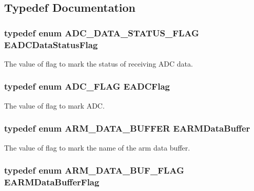 \subsection{Typedef Documentation}
\hypertarget{group___enum_grp_ga28f90ca377a944d61b5d7c95655e2d97}{
\subsubsection[{E\-A\-D\-C\-Data\-Status\-Flag}]{\setlength{\rightskip}{0pt plus 5cm}typedef enum A\-D\-C\-\_\-\-D\-A\-T\-A\-\_\-\-S\-T\-A\-T\-U\-S\-\_\-\-F\-L\-A\-G  {\bf E\-A\-D\-C\-Data\-Status\-Flag}}}\label{group___enum_grp_ga28f90ca377a944d61b5d7c95655e2d97}
The value of flag to mark the status of receiving A\-D\-C data. \hypertarget{group___enum_grp_ga7a77f876c6fae36cb97dfc3ba1e07665}{
\subsubsection[{E\-A\-D\-C\-Flag}]{\setlength{\rightskip}{0pt plus 5cm}typedef enum A\-D\-C\-\_\-\-F\-L\-A\-G  {\bf E\-A\-D\-C\-Flag}}}\label{group___enum_grp_ga7a77f876c6fae36cb97dfc3ba1e07665}
The value of flag to mark A\-D\-C. \hypertarget{group___enum_grp_ga0556af71c2e177b00bb1ec7741d36624}{
\subsubsection[{E\-A\-R\-M\-Data\-Buffer}]{\setlength{\rightskip}{0pt plus 5cm}typedef enum A\-R\-M\-\_\-\-D\-A\-T\-A\-\_\-\-B\-U\-F\-F\-E\-R  {\bf E\-A\-R\-M\-Data\-Buffer}}}\label{group___enum_grp_ga0556af71c2e177b00bb1ec7741d36624}
The value of flag to mark the name of the arm data buffer. \hypertarget{group___enum_grp_gafa703983b61d6eddeeaca1f48ec61efc}{
\subsubsection[{E\-A\-R\-M\-Data\-Buffer\-Flag}]{\setlength{\rightskip}{0pt plus 5cm}typedef enum A\-R\-M\-\_\-\-D\-A\-T\-A\-\_\-\-B\-U\-F\-\_\-\-F\-L\-A\-G  {\bf E\-A\-R\-M\-Data\-Buffer\-Flag}}}\label{group___enum_grp_gafa703983b61d6eddeeaca1f48ec61efc}
